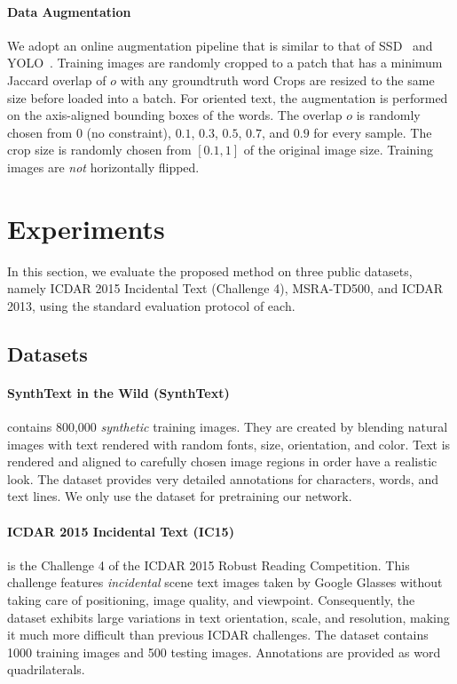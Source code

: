 \documentclass[10pt,twocolumn,letterpaper]{article}
\begin{document}
\paragraph{Data Augmentation}
We adopt an online augmentation pipeline that is similar to that of SSD~\cite{eccv/LiuAESRFB16} and YOLO~\cite{corr/RedmonDGF15}.
Training images are randomly cropped to a patch that has a minimum Jaccard overlap of $o$ with any groundtruth word
Crops are resized to the same size before loaded into a batch.
For oriented text, the augmentation is performed on the axis-aligned bounding boxes of the words.
The overlap $o$ is randomly chosen from $0$ (no constraint), $0.1$, $0.3$, $0.5$, $0.7$, and $0.9$ for every sample.
The crop size is randomly chosen from $[0.1, 1]$ of the original image size.
Training images are \emph{not} horizontally flipped.

\section{Experiments}

In this section, we evaluate the proposed method on three public datasets, namely ICDAR 2015 Incidental Text (Challenge 4), MSRA-TD500, and ICDAR 2013, using the standard evaluation protocol of each.

\subsection{Datasets}

\paragraph{SynthText in the Wild (SynthText)~\cite{cvpr/GuptaVZ16}} contains 800,000 \emph{synthetic} training images.
They are created by blending natural images with text rendered with random fonts, size, orientation, and color.
Text is rendered and aligned to carefully chosen image regions in order have a realistic look.
The dataset provides very detailed annotations for characters, words, and text lines.
We only use the dataset for pretraining our network.

\paragraph{ICDAR 2015 Incidental Text (IC15)~\cite{icdar/KaratzasGNGBIMN15}} is the Challenge 4 of the ICDAR 2015 Robust Reading Competition.
This challenge features \emph{incidental} scene text images taken by Google Glasses without taking care of positioning, image quality, and viewpoint.
Consequently, the dataset exhibits large variations in text orientation, scale, and resolution, making it much more difficult than previous ICDAR challenges.
The dataset contains 1000 training images and 500 testing images.
Annotations are provided as word quadrilaterals.
\end{document}
